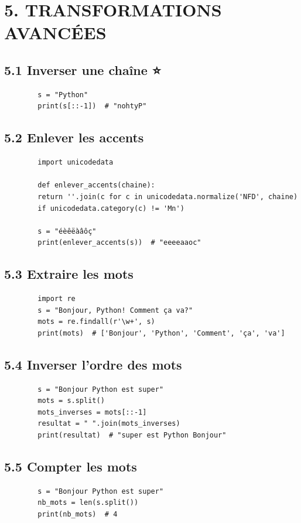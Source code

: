 \documentclass[12pt,a4paper]{article}
\begin{document}
	\section*{\color{orange}5. TRANSFORMATIONS AVANCÉES}
	
	\subsection*{\color{cyan}5.1 Inverser une chaîne ⭐}
	\begin{lstlisting}
		s = "Python"
		print(s[::-1])  # "nohtyP"
	\end{lstlisting}
	
	\subsection*{\color{cyan}5.2 Enlever les accents}
	\begin{lstlisting}
		import unicodedata
		
		def enlever_accents(chaine):
		return ''.join(c for c in unicodedata.normalize('NFD', chaine)
		if unicodedata.category(c) != 'Mn')
		
		s = "éèêëàâôç"
		print(enlever_accents(s))  # "eeeeaaoc"
	\end{lstlisting}
	
	\subsection*{\color{cyan}5.3 Extraire les mots}
	\begin{lstlisting}
		import re
		s = "Bonjour, Python! Comment ça va?"
		mots = re.findall(r'\w+', s)
		print(mots)  # ['Bonjour', 'Python', 'Comment', 'ça', 'va']
	\end{lstlisting}
	
	\subsection*{\color{cyan}5.4 Inverser l'ordre des mots}
	\begin{lstlisting}
		s = "Bonjour Python est super"
		mots = s.split()
		mots_inverses = mots[::-1]
		resultat = " ".join(mots_inverses)
		print(resultat)  # "super est Python Bonjour"
	\end{lstlisting}
	
	\subsection*{\color{cyan}5.5 Compter les mots}
	\begin{lstlisting}
		s = "Bonjour Python est super"
		nb_mots = len(s.split())
		print(nb_mots)  # 4
	\end{lstlisting}
	
\end{document}
